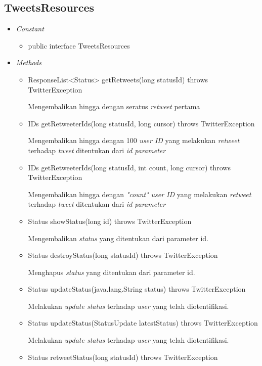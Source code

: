	\subsection{TweetsResources}
	\begin{itemize}
		\item \textit{Constant}
		
		\begin{itemize}
			\item public interface TweetsResources
						
		\end{itemize}
		\item \textit{Methods}
		
		\begin{itemize}
			\item ResponseList<Status> getRetweets(long statusId) throws TwitterException
			
			Mengembalikan hingga dengan seratus \textit{retweet} pertama
			\item IDs getRetweeterIds(long statusId, long cursor) throws TwitterException
			
			Mengembalikan hingga dengan 100 \textit{user ID} yang melakukan \textit{retweet} terhadap \textit{tweet} ditentukan dari \textit{id parameter}
			\item IDs getRetweeterIds(long statusId, int count, long cursor) throws TwitterException
			
			Mengembalikan hingga dengan \textit{"count"} \textit{user ID} yang melakukan \textit{retweet} terhadap \textit{tweet} ditentukan dari \textit{id parameter}
			\item Status showStatus(long id) throws TwitterException
			
			Mengembalikan \textit{status} yang ditentukan dari parameter id.
			\item Status destroyStatus(long statusId) throws TwitterException
			
			Menghapus \textit{status} yang ditentukan dari parameter id.
			\item Status updateStatus(java.lang.String status) throws TwitterException
			
			Melakukan \textit{update status} terhadap \textit{user} yang telah diotentifikasi.
			\item Status updateStatus(StatusUpdate latestStatus) throws TwitterException
			
			Melakukan \textit{update status} terhadap \textit{user} yang telah diotentifikasi.
			\item Status retweetStatus(long statusId) throws TwitterException
			

\end{itemize}
\end{itemize}
